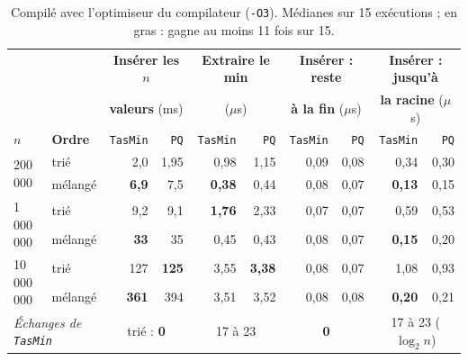 \documentclass[11pt,a4paper]{article}
\begin{document}
\begin{table}[H]
\centering
\small
\setlength{\tabcolsep}{4pt}
\begin{tabular}{|l|l|r|r|r|r|r|r|r|r|}
\hline
\multicolumn{2}{|c|}{} & \multicolumn{2}{c|}{\textbf{Insérer les $n$}} & \multicolumn{2}{c|}{\textbf{Extraire le min}}
  & \multicolumn{2}{c|}{\textbf{Insérer : reste}} & \multicolumn{2}{c|}{\textbf{Insérer : jusqu'à}} \\
\multicolumn{2}{|c|}{} & \multicolumn{2}{c|}{\textbf{valeurs} (ms)} & \multicolumn{2}{c|}{($\mu$s)}
  & \multicolumn{2}{c|}{\textbf{à la fin} ($\mu$s)} & \multicolumn{2}{c|}{\textbf{la racine} ($\mu$s)} \\
\hline
$n$ & \textbf{Ordre} & \texttt{TasMin} & \texttt{PQ} & \texttt{TasMin} & \texttt{PQ}
    & \texttt{TasMin} & \texttt{PQ} & \texttt{TasMin} & \texttt{PQ} \\
\hline
\multirow{2}{*}{200\,000}     & trié    & 2,0  & 1,95 & 0,98 & 1,15 & 0,09 & 0,08 & 0,34 & 0,30 \\
\cline{2-10}
                              & mélangé & \textbf{6,9} & 7,5 & \textbf{0,38} & 0,44 & 0,08 & 0,07 & \textbf{0,13} & 0,15 \\
\hline
\multirow{2}{*}{1\,000\,000}  & trié    & 9,2  & 9,1  & \textbf{1,76} & 2,33 & 0,07 & 0,07 & 0,59 & 0,53 \\
\cline{2-10}
                              & mélangé & \textbf{33} & 35 & 0,45 & 0,43 & 0,08 & 0,07 & \textbf{0,15} & 0,20 \\
\hline
\multirow{2}{*}{10\,000\,000} & trié    & 127  & \textbf{125} & 3,55 & \textbf{3,38} & 0,08 & 0,07 & 1,08 & 0,93 \\
\cline{2-10}
                              & mélangé & \textbf{361} & 394 & 3,51 & 3,52 & 0,08 & 0,08 & \textbf{0,20} & 0,21 \\
\hline
\multicolumn{2}{|l|}{\textit{Échanges de \texttt{TasMin}}} & \multicolumn{2}{c|}{trié : \textbf{0}} & \multicolumn{2}{c|}{17 à 23}
  & \multicolumn{2}{c|}{\textbf{0}} & \multicolumn{2}{c|}{17 à 23 ($\log_2 n$)} \\
\hline
\end{tabular}
\caption{Compilé avec l'optimiseur du compilateur (\texttt{-O3}). Médianes sur 15 exécutions ;
en gras : gagne au moins 11 fois sur 15.}
\end{table}
\end{document}
